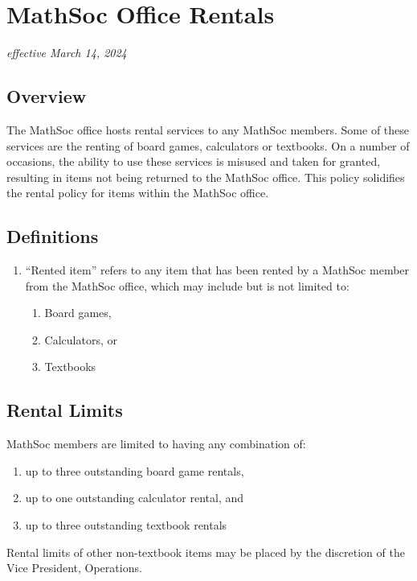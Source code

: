 \section{MathSoc Office Rentals}
\emph{effective March 14, 2024}\\

\subsection{Overview}

The MathSoc office hosts rental services to any MathSoc members. Some of these services are the renting of board games, calculators or textbooks. On a number of occasions, the ability to use these services is misused and taken for granted, resulting in items not being returned to the MathSoc office. This policy solidifies the rental policy for items within the MathSoc office.


\subsection{Definitions}
\begin{enumerate}
    \item “Rented item” refers to any item that has been rented by a MathSoc member from the MathSoc office, which may include but is not limited to:
    \begin{enumerate}
        \item Board games,
        \item Calculators, or
        \item Textbooks
    \end{enumerate}
\end{enumerate}

\subsection{Rental Limits}

MathSoc members are limited to having any combination of:
\begin{enumerate}
    \item up to three outstanding board game rentals,
    \item up to one outstanding calculator rental, and
    \item up to three outstanding textbook rentals
\end{enumerate}
Rental limits of other non-textbook items may be placed by the discretion of the Vice President, Operations.

